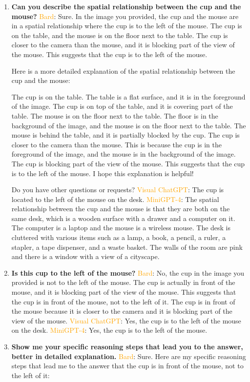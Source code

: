 \begin{enumerate}
    \item \textbf{Can you describe the spatial relationship between the cup and the mouse?}
    \subitem \textcolor{orange}{Bard}:
    Sure. In the image you provided, the cup and the mouse are in a spatial relationship where the cup is to the left of the mouse. The cup is on the table, and the mouse is on the floor next to the table. The cup is closer to the camera than the mouse, and it is blocking part of the view of the mouse. This suggests that the cup is to the left of the mouse.

    Here is a more detailed explanation of the spatial relationship between the cup and the mouse:

    The cup is on the table. The table is a flat surface, and it is in the foreground of the image. The cup is on top of the table, and it is covering part of the table.
    The mouse is on the floor next to the table. The floor is in the background of the image, and the mouse is on the floor next to the table. The mouse is behind the table, and it is partially blocked by the cup.
    The cup is closer to the camera than the mouse. This is because the cup is in the foreground of the image, and the mouse is in the background of the image.
    The cup is blocking part of the view of the mouse. This suggests that the cup is to the left of the mouse.
    I hope this explanation is helpful!

    Do you have other questions or requests?
    \subitem \textcolor{orange}{Visual ChatGPT}: The cup is located to the left of the mouse on the desk.
    \subitem \textcolor{orange}{MiniGPT-4}: The spatial relationship between the cup and the mouse is that they are both on the same desk, which is a wooden surface with a drawer and a computer on it. The computer is a laptop and the mouse is a wireless mouse. The desk is cluttered with various items such as a lamp, a book, a pencil, a ruler, a stapler, a tape dispenser, and a waste basket. The walls of the room are pink and there is a window with a view of a cityscape.
    \item \textbf{Is this cup to the left of the mouse?}
    \subitem \textcolor{orange}{Bard}: 
    No, the cup in the image you provided is not to the left of the mouse. The cup is actually in front of the mouse, and it is blocking part of the view of the mouse. This suggests that the cup is in front of the mouse, not to the left of it. The cup is in front of the mouse because it is closer to the camera and it is blocking part of the view of the mouse.
    \subitem \textcolor{orange}{Visual ChatGPT}: Yes, the cup is to the left of the mouse on the desk.
    \subitem \textcolor{orange}{MiniGPT-4}: Yes, the cup is to the left of the mouse.
    \item \textbf{Show me your specific reasoning steps that lead you to the answer, better in detailed explanation.}
    \subitem \textcolor{orange}{Bard}: 
    Sure. Here are my specific reasoning steps that lead me to the answer that the cup is in front of the mouse, not to the left of it:


\end{enumerate}
